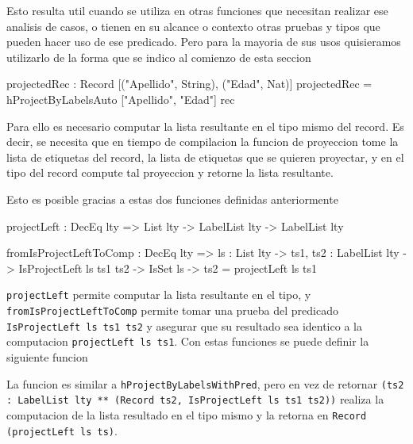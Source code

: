 Esto resulta util cuando se utiliza en otras funciones que necesitan realizar ese analisis de casos, o tienen en su alcance o contexto otras pruebas y tipos que pueden hacer uso de ese predicado. Pero para la mayoria de sus usos quisieramos utilizarlo de la forma que se indico al comienzo de esta seccion

\begin{code}
projectedRec : Record [("Apellido", String), 
  ("Edad", Nat)]
projectedRec = hProjectByLabelsAuto 
  ["Apellido", "Edad"] rec
\end{code}

Para ello es necesario computar la lista resultante en el tipo mismo del record. Es decir, se necesita que en tiempo de compilacion la funcion de proyeccion tome la lista de etiquetas del record, la lista de etiquetas que se quieren proyectar, y en el tipo del record compute tal proyeccion y retorne la lista resultante.

Esto es posible gracias a estas dos funciones definidas anteriormente

\begin{code}
projectLeft : DecEq lty => List lty -> LabelList lty -> 
  LabelList lty 

fromIsProjectLeftToComp : DecEq lty => 
  {ls : List lty} -> {ts1, ts2 : LabelList lty} -> 
  IsProjectLeft ls ts1 ts2 -> 
  IsSet ls -> ts2 = projectLeft ls ts1
\end{code}

\texttt{projectLeft} permite computar la lista resultante en el tipo, y \texttt{fromIsProjectLeftToComp} permite tomar una prueba del predicado \texttt{IsProjectLeft ls ts1 ts2} y asegurar que su resultado sea identico a la computacion \texttt{projectLeft ls ts1}. Con estas funciones se puede definir la siguiente funcion


La funcion es similar a \texttt{hProjectByLabelsWithPred}, pero en vez de retornar \texttt{(ts2 : LabelList lty ** (Record ts2, IsProjectLeft ls ts1 ts2))} realiza la computacion de la lista resultado en el tipo mismo y la retorna en \texttt{Record (projectLeft ls ts)}.

